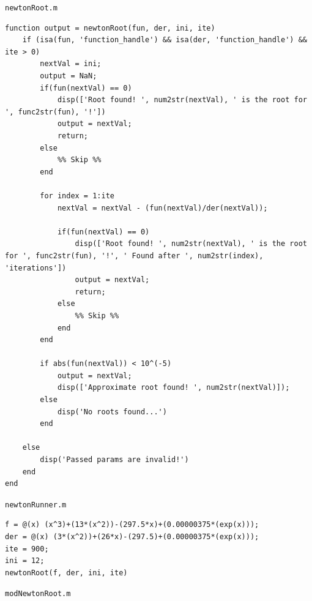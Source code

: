\documentclass[english,notitlepage,letterpaper, 10pt]{article} %
\begin{document}
\texttt{newtonRoot.m}
\begin{lstlisting}
function output = newtonRoot(fun, der, ini, ite)
    if (isa(fun, 'function_handle') && isa(der, 'function_handle') && ite > 0)
        nextVal = ini;
        output = NaN;
        if(fun(nextVal) == 0) 
            disp(['Root found! ', num2str(nextVal), ' is the root for ', func2str(fun), '!'])
            output = nextVal;    
            return;
        else
            %% Skip %%
        end
        
        for index = 1:ite
            nextVal = nextVal - (fun(nextVal)/der(nextVal));
            
            if(fun(nextVal) == 0) 
                disp(['Root found! ', num2str(nextVal), ' is the root for ', func2str(fun), '!', ' Found after ', num2str(index), 'iterations'])
                output = nextVal;
                return;
            else
                %% Skip %%
            end
        end

        if abs(fun(nextVal)) < 10^(-5)
            output = nextVal;
            disp(['Approximate root found! ', num2str(nextVal)]);
        else
            disp('No roots found...')
        end

    else
        disp('Passed params are invalid!')
    end
end 
\end{lstlisting}
\texttt{newtonRunner.m}
\begin{lstlisting}
f = @(x) (x^3)+(13*(x^2))-(297.5*x)+(0.00000375*(exp(x)));
der = @(x) (3*(x^2))+(26*x)-(297.5)+(0.00000375*(exp(x)));
ite = 900;
ini = 12;
newtonRoot(f, der, ini, ite)
\end{lstlisting}
\texttt{modNewtonRoot.m}
\end{document}
